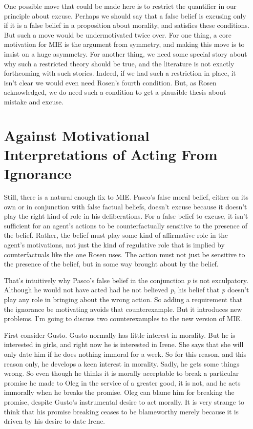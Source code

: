 \documentclass[
  10pt,
  letterpaper,
  twoside]{scrbook}
\begin{document}
One possible move that could be made here is to restrict the quantifier
in our principle about excuse. Perhaps we should say that a false belief
is excusing only if it is a false belief in a proposition about
morality, and satisfies these conditions. But such a move would be
undermotivated twice over. For one thing, a core motivation for MIE is
the argument from symmetry, and making this move is to insist on a huge
asymmetry. For another thing, we need some special story about why such
a restricted theory should be true, and the literature is not exactly
forthcoming with such stories. Indeed, if we had such a restriction in
place, it isn't clear we would even need Rosen's fourth condition. But,
as Rosen acknowledged, we do need such a condition to get a plausible
thesis about mistake and excuse.

\section{Against Motivational Interpretations of Acting From
Ignorance}\label{againstmotivationalinterpretationsofactingfromignorance}

Still, there is a natural enough fix to MIE. {Pasco}'s false moral
belief, either on its own or in conjunction with false factual beliefs,
doesn't excuse because it doesn't play the right kind of role in his
deliberations. For a false belief to excuse, it isn't sufficient for an
agent's actions to be counterfactually sensitive to the presence of the
belief. Rather, the belief must play some kind of affirmative role in
the agent's motivations, not just the kind of regulative role that is
implied by counterfactuals like the one Rosen uses. The action must not
just be sensitive to the presence of the belief, but in some way brought
about by the belief.

That's intuitively why {Pasco}'s false belief in the conjunction
\emph{p} is not exculpatory. Although he would not have acted had he not
believed \emph{p}, his belief that \emph{p} doesn't play any role in
bringing about the wrong action. So adding a requirement that the
ignorance be motivating avoids that counterexample. But it introduces
new problems. I'm going to discuss two counterexamples to the new
version of MIE.

First consider {Gusto}. {Gusto} normally has little interest in
morality. But he is interested in girls, and right now he is interested
in {Irene}. She says that she will only date him if he does nothing
immoral for a week. So for this reason, and this reason only, he
develops a keen interest in morality. Sadly, he gets some things wrong.
So even though he thinks it is morally acceptable to break a particular
promise he made to {Oleg} in the service of a greater good, it is not,
and he acts immorally when he breaks the promise. {Oleg} can blame him
for breaking the promise, despite {Gusto}'s instrumental desire to act
morally. It is very strange to think that his promise breaking ceases to
be blameworthy merely because it is driven by his desire to date
{Irene}.
\end{document}
